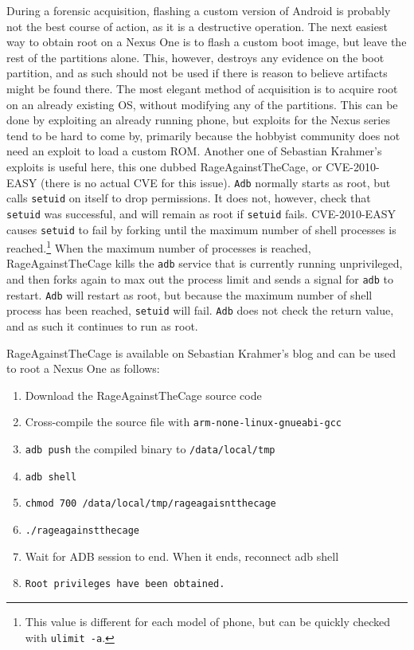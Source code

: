 During a forensic acquisition, flashing a custom version of Android is probably not the best course of action, as it is a
destructive operation.  The next easiest way to obtain root on a Nexus One is to flash a custom boot image, but leave the rest of
the partitions alone.  This, however, destroys any evidence on the boot partition, and as such should not be used if there is reason
to believe artifacts might be found there.  The most elegant method of acquisition is to acquire root on an already existing OS,
without modifying any of the partitions.  This can be done by exploiting an already running phone, but exploits for the Nexus series
tend to be hard to come by, primarily because the hobbyist community does not need an exploit to load a custom ROM.  Another one of
Sebastian Krahmer's exploits is useful here, this one dubbed RageAgainstTheCage, or CVE-2010-EASY (there is no actual CVE for this
issue).  \texttt{Adb} normally starts as root, but calls \texttt{setuid} on itself
to drop permissions.  It does not, however, check that \texttt{setuid} was successful, and will remain as root if \texttt{setuid}
fails.  CVE-2010-EASY causes \texttt{setuid} to fail by forking until the maximum number of shell processes is
reached.\footnote{This value is different for each model of phone, but can be quickly checked with \texttt{ulimit -a}.}  
When the maximum number of processes is reached, RageAgainstTheCage kills the \texttt{adb} service that is currently running
unprivileged, and then forks again to max out the process limit and sends a signal for \texttt{adb} to restart.  \texttt{Adb} will
restart as root, but because the maximum number of shell process has been reached, \texttt{setuid} will fail.  \texttt{Adb} does not
check the return value, and as such it continues to run as root.

RageAgainstTheCage is available on Sebastian Krahmer's blog and can be used to root a Nexus One as follows:
\begin{enumerate}
	\item Download the RageAgainstTheCage source code
	\item Cross-compile the source file with \texttt{arm-none-linux-gnueabi-gcc}
	\item \texttt{adb push} the compiled binary to \texttt{/data/local/tmp}
	\item \texttt{adb shell}
	\item \texttt{chmod 700 /data/local/tmp/rageagaisntthecage}
	\item \texttt{./rageagainstthecage}
	\item Wait for ADB session to end. When it ends, reconnect adb shell
	\item \texttt{Root privileges have been obtained.}
\end{enumerate}	

